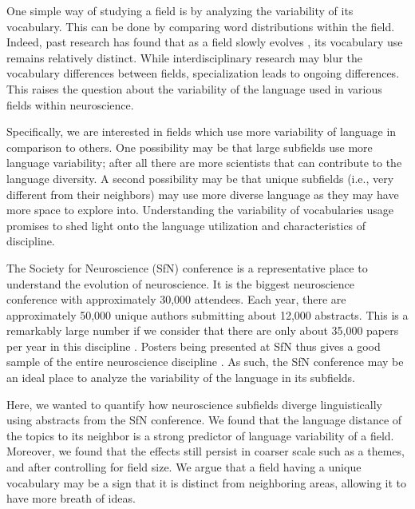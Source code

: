 \documentclass[10pt,letterpaper]{article}
\begin{document}
One simple way of studying a field is by analyzing the variability of its vocabulary. This can be done by comparing word distributions within the field. Indeed, past research has found that as a field slowly evolves \cite{dias2017using}, its vocabulary use remains relatively distinct. While interdisciplinary research may blur the vocabulary differences between fields, specialization leads to ongoing differences. This raises the question about the variability of the language used in various fields within neuroscience.

Specifically, we are interested in fields which use more variability of language in comparison to others. One possibility may be that large subfields use more language variability; after all there are more scientists that can contribute to the language diversity. A second possibility may be that unique subfields (i.e., very different from their neighbors) may use more diverse language as they may have more space to explore into. Understanding the variability of vocabularies usage promises to shed light onto the language utilization and characteristics of discipline.

The Society for Neuroscience (SfN) conference is a representative place to understand the evolution of neuroscience. It is the biggest neuroscience conference with approximately 30,000 attendees. Each year, there are approximately 50,000 unique authors submitting about 12,000 abstracts. This is a remarkably large number if we consider that there are only about 35,000 papers per year in this discipline \cite{yeung2017changing}. Posters being presented at SfN thus gives a good sample of the entire neuroscience discipline \cite{david2012neurotree}. As such, the SfN conference may be an ideal place to analyze the variability of the language in its subfields.

Here, we wanted to quantify how neuroscience subfields diverge linguistically using abstracts from the SfN conference. We found that the language distance of the topics to its neighbor is a strong predictor of language variability of a field. Moreover, we found that the effects still persist in coarser scale such as a themes, and after controlling for field size. We argue that a field having a unique vocabulary may be a sign that it is distinct from neighboring areas, allowing it to have more breath of ideas.


\end{document}
